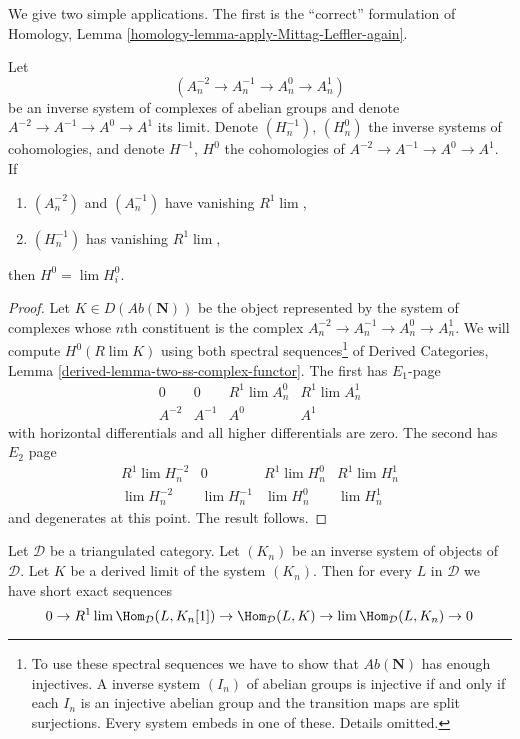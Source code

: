 \noindent
We give two simple applications. The first is the ``correct'' formulation of
Homology, Lemma \ref{homology-lemma-apply-Mittag-Leffler-again}.

\begin{lemma}
\label{lemma-apply-Mittag-Leffler-again}
Let
$$
(A^{-2}_n \to A^{-1}_n \to A^0_n \to A^1_n)
$$
be an inverse system of complexes of abelian groups and denote
$A^{-2} \to A^{-1} \to A^0 \to A^1$ its limit. Denote
$(H_n^{-1})$, $(H_n^0)$ the inverse systems of cohomologies, and
denote $H^{-1}$, $H^0$ the cohomologies of $A^{-2} \to A^{-1} \to A^0 \to A^1$.
If
\begin{enumerate}
\item $(A^{-2}_n)$ and $(A^{-1}_n)$ have vanishing $R^1\lim$,
\item $(H^{-1}_n)$ has vanishing $R^1\lim$,
\end{enumerate}
then $H^0 = \lim H_i^0$.
\end{lemma}

\begin{proof}
Let $K \in D(\textit{Ab}(\mathbf{N}))$ be the object represented
by the system of complexes whose $n$th constituent
is the complex $A^{-2}_n \to A^{-1}_n \to A^0_n \to A^1_n$.
We will compute $H^0(R\lim K)$ using both spectral
sequences\footnote{To use these spectral sequences we have to
show that $\textit{Ab}(\mathbf{N})$ has enough injectives.
A inverse system $(I_n)$ of abelian groups is injective if and only
if each $I_n$ is an injective abelian group and the transition maps are
split surjections. Every system embeds in one of these. Details omitted.} of
Derived Categories, Lemma \ref{derived-lemma-two-ss-complex-functor}.
The first has $E_1$-page
$$
\begin{matrix}
0 & 0 & R^1\lim A^0_n  & R^1\lim A^1_n \\
A^{-2} & A^{-1} & A^0  & A^1
\end{matrix}
$$
with horizontal differentials and all higher differentials are zero.
The second has $E_2$ page
$$
\begin{matrix}
R^1\lim H^{-2}_n & 0 & R^1\lim H^0_n & R^1 \lim H^1_n \\
\lim H^{-2}_n &
\lim H^{-1}_n &
\lim H^0_n &
\lim H^1_n
\end{matrix}
$$
and degenerates at this point. The result follows.
\end{proof}

\begin{lemma}
\label{lemma-map-into-Rlim}
Let $\mathcal{D}$ be a triangulated category. Let
$(K_n)$ be an inverse system of objects of $\mathcal{D}$.
Let $K$ be a derived limit of the system $(K_n)$.
Then for every $L$ in $\mathcal{D}$ we have short exact sequences
$$
0 \to R^1\lim \Hom_\mathcal{D}(L, K_n[1]) \to
\Hom_\mathcal{D}(L, K) \to
\lim \Hom_\mathcal{D}(L, K_n) \to 0
$$
\end{lemma}

